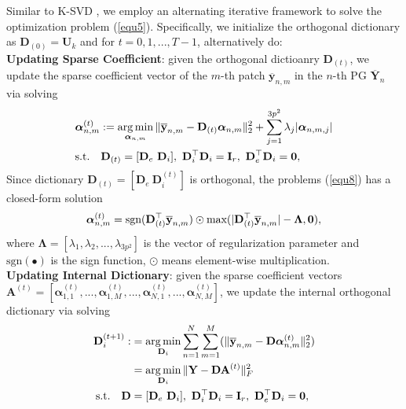 \documentclass[10pt,twocolumn,letterpaper]{article}
\DeclareMathOperator*{\argmin}{arg\,min}
\begin{document}
Similar to K-SVD \cite{ksvd}, we employ an alternating iterative framework to solve the optimization problem (\ref{equ5}). Specifically, we initialize the orthogonal dictionary as $\mathbf{D}_{(0)}=\mathbf{U}_{k}$ and for $t=0, 1, ..., T-1$, alternatively do:
\\
\textbf{Updating Sparse Coefficient}: given the orthogonal dictioanry $\textbf{D}_{(t)}$, we update the sparse coefficient vector of the $m$-th patch $\mathbf{\overline{y}}_{n,m}$ in the $n$-th PG $\mathbf{\overline{Y}}_{n}$ via solving
\vspace{-3mm}
\begin{equation}\label{equ8}\vspace{-3mm}
\begin{split}
&\bm{\alpha}_{n,m}^{(t)}:=\argmin_{\bm{\alpha}_{n,m}}
\|\mathbf{\overline{y}}_{n,m}-\mathbf{D}_{(t)}\bm{\alpha}_{n,m}\|_{2}^{2}+\sum_{j=1}^{3p^{2}}\lambda_{j}|\bm{\alpha}_{n,m,j}|
\\
&
\text{s.t.}
\quad
\mathbf{D}_{(t)}=[\mathbf{D}_{e}\ \mathbf{D}_{i}],\ \mathbf{D}_{i}^{\top}\mathbf{D}_{i} = \mathbf{I}_{r},\ \mathbf{D}_{e}^{\top}\mathbf{D}_{i} = \mathbf{0},
\end{split}
\end{equation}
Since dictionary $\mathbf{D}_{(t)}=[\mathbf{D}_{e}\ \mathbf{D}_{i}^{(t)}]$ is orthogonal, the problems (\ref{equ8}) has a closed-form solution \cite{pgpd} 
\vspace{-2mm}
\begin{equation}\label{equ9}\vspace{-2mm}
\bm{\alpha}_{n,m}^{(t)}= \text{sgn}(\mathbf{D}_{(t)}^{\top}\mathbf{\overline{y}}_{n,m})\odot \text{max}(|\mathbf{D}_{(t)}^{\top}\mathbf{\overline{y}}_{n,m}|-\mathbf{\Lambda},\mathbf{0}),
\end{equation}
where $\mathbf{\Lambda} = [\lambda_{1},\lambda_{2},...,\lambda_{3p^2}]$ is the vector of regularization parameter and $\text{sgn}(\bullet)$ is the sign function, $\odot$ means element-wise multiplication.
\\
\textbf{Updating Internal Dictionary}: given the sparse coefficient vectors $\textbf{A}^{(t)}=[\bm{\alpha}_{1,1}^{(t)},...,\bm{\alpha}_{1,M}^{(t)},...,\bm{\alpha}_{N,1}^{(t)},...,\bm{\alpha}_{N,M}^{(t)}]$, we update the internal orthogonal dictionary via solving
\vspace{-2mm}
\begin{equation}\label{equ10} \vspace{-2mm}
\begin{split}
\textbf{D}_{i}^{(t+1)}
:
&
=
\argmin_{\textbf{D}_{i}}
\sum_{n=1}^{N}\sum_{m=1}^{M}(\|\mathbf{\overline{y}}_{n,m}-\mathbf{D}\bm{\alpha}_{n,m}^{(t)}\|_{2}^{2})
\\
&
=
\argmin_{\textbf{D}_{i}}
\|\mathbf{Y}-\mathbf{D}\mathbf{A}^{(t)}\|_{F}^{2}
\\
\text{s.t.}
\quad
\mathbf{D}
&
=
[\mathbf{D}_{e}\ \mathbf{D}_{i}],\ \mathbf{D}_{i}^{\top}\mathbf{D}_{i} = \mathbf{I}_{r},\ \mathbf{D}_{e}^{\top}\mathbf{D}_{i} = \mathbf{0},
\end{split}
\end{equation}
\end{document}
